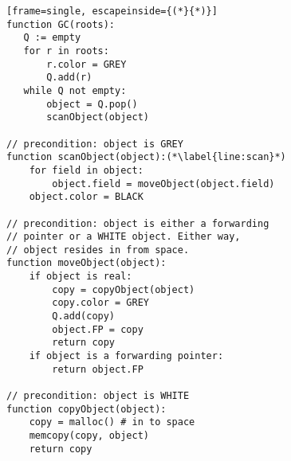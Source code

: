 \begin{lstlisting}[frame=single, escapeinside={(*}{*)}]
function GC(roots):
   Q := empty
   for r in roots:
       r.color = GREY
       Q.add(r)
   while Q not empty:
       object = Q.pop()
       scanObject(object)

// precondition: object is GREY
function scanObject(object):(*\label{line:scan}*)
    for field in object:
        object.field = moveObject(object.field)
    object.color = BLACK

// precondition: object is either a forwarding
// pointer or a WHITE object. Either way,
// object resides in from space.
function moveObject(object):
    if object is real:
        copy = copyObject(object)
        copy.color = GREY
        Q.add(copy)
        object.FP = copy
        return copy
    if object is a forwarding pointer:
        return object.FP

// precondition: object is WHITE
function copyObject(object):
    copy = malloc() # in to space
    memcopy(copy, object)
    return copy
\end{lstlisting}
